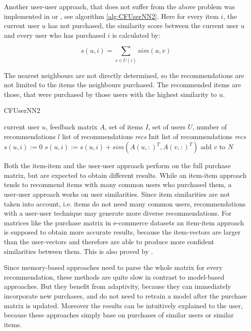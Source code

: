 \documentclass[10pt]{reportMaster}
\begin{document}
Another user-user approach, that does not suffer from the above problem was implemented in \cite{efficientTopN} or \cite{effectiveLatentModels}, see algorithm \ref{alg:CFUserNN2}.
Here for every item $i$, the current user $u$ has not purchased, the similarity score between the current user $u$ and every user who has purchased $i$ is calculated by: 

\begin{equation}
	s(u,i) = \sum_{v \in U(i)}{sim(u,v)}
\end{equation}

The nearest neighbours are not directly determined, so the recommendations are not limited to the items the neighbours purchased.
The recommended items are those, that were purchased by those users with the highest similarity to $u$.

\begin{algorithm}
	\caption{CFUserNN2}
	\label{alg:CFUserNN2}
	\begin{algorithmic}[1]
		\Require current user $u$, feedback matrix $A$, set of items $I$, set of users $U$, number of recommendations $l$
		\Ensure list of recommendations \textit{recs}
		\State Init list of recommendations \textit{recs}
			\State $s(u,i) := 0$
				\State $s(u,i) := s(u,i) + sim(A(u,:)^T, A(v,:)^T)$
			\EndFor
				\State add $v$ to $N$
			\EndIf
		\EndFor
	\end{algorithmic}	
\end{algorithm}

Both the item-item and the user-user approach perform on the full purchase matrix, but are expected to obtain different results.
While an item-item approach tends to recommend items with many common users who purchased them, a user-user approach works on user similarities.
Since item similarities are not taken into account, i.e. items do not need many common users, recommendations with a user-user technique may generate more diverse recommendations.
For matrices like the purchase matrix in e-commerce datasets an item-item approach is supposed to obtain more accurate results, because the item-vectors are larger than the user-vectors and therefore are able to produce more confident similarities between them.
This is also proved by \cite{itemItemAlgorithms}. 

Since memory-based approaches need to parse the whole matrix for every recommendation, these methods are quite slow in contrast to model-based approaches.
But they benefit from adaptivity, because they can immediately incorporate new purchases, and do not need to retrain a model after the purchase matrix is updated.
Moreover the results can be intuitively explained to the user, because these approaches simply base on purchases of similar users or similar items.
\end{document}
